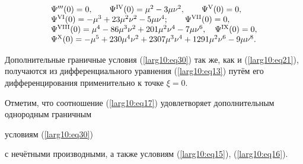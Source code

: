 \begin{equation}

\label{larg10:eq30}

\begin{array}{l}

\Psi '''(0)=0, \qquad \Psi^{\rm IV}(0)=\mu^2 - 3\mu \nu^2, \qquad \Psi^{\rm V}(0)=0, \\

\Psi^{\rm VI}(0)=-\mu^3 + 23\mu^2 \nu^2 - 5 \mu \nu^4; \qquad \Psi^{\rm VII}(0)=0, \\

\Psi^{\rm VIII}(0)=\mu^4 - 86 \mu^3 \nu^2 + 201 \mu^2 \nu^4 - 7\mu \nu^6, \quad \Psi^{\rm IX}(0)=0,\\

\Psi^{\rm X} (0) = -\mu^5 + 230 \mu^4 \nu^2 + 2307 \mu^3 \nu^4 + 1291 \mu^2 \nu^6 - 9\mu \nu^8.

\end{array}

\end{equation}



Дополнительные граничные условия (\ref{larg10:eq30}) так же, как и (\ref{larg10:eq21}),  получаются из дифференциального уравнения (\ref{larg10:eq13}) путём его дифференцирования применительно к точке $\xi =0$.

Отметим, что соотношение (\ref{larg10:eq17}) удовлетворяет дополнительным однородным граничным

условиям (\ref{larg10:eq30}) %

с нечётными производными,  а также условиям (\ref{larg10:eq15}), (\ref{larg10:eq16}).









